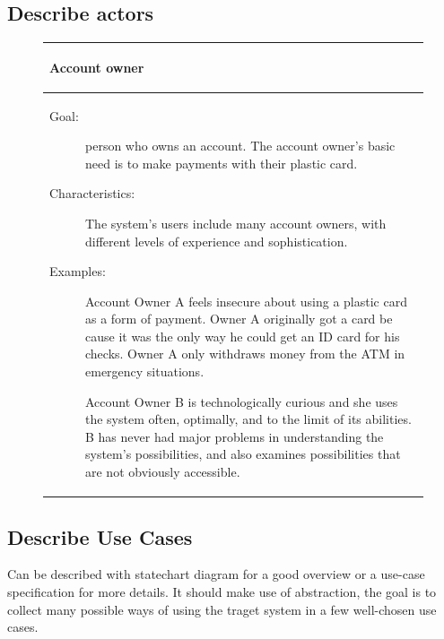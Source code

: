 \subsection*{Describe actors}
\begin{figure}[H]
    \begin{tabular}{p{\textwidth }}
        \\\hline
        \begin{center}
            Account owner
        \end{center}
        \\\hline
        \begin{description}
            \item[Goal:] person who owns an account. The account owner’s basic need is to make payments with their plastic card.
            \item[Characteristics:] The system’s users include many account owners, with different levels of experience and sophistication.
            \item[Examples:] Account Owner A feels insecure about using a plastic card as a form of payment. Owner A originally got a card be cause it was the only way he could get an ID card for his checks. Owner A only withdraws money from the ATM in emergency situations.
            \item[] Account Owner B is technologically curious and she uses the system often, optimally, and to the limit of its abilities. B has never had major problems in understanding the system’s possibilities, and also examines possibilities that are not obviously accessible.
        \end{description}
        \\\hline
    \end{tabular}
\end{figure}
\subsection*{Describe Use Cases}
Can be described with statechart diagram for a good overview or a use-case specification for more details. It should make use of abstraction, the goal is to collect many possible ways of using the traget system in a few well-chosen use cases.

